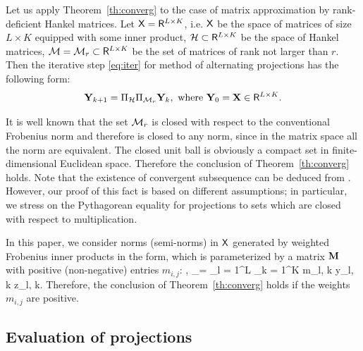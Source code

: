 \documentclass[sii]{ipart}
\begin{document}
\medskip
Let us apply Theorem~\ref{th:converg} to the case of matrix approximation by rank-deficient Hankel matrices. Let $\mathsf{X} = \mathsf{R}^{L\times K}$, i.e. $\mathsf{X}$ be the space of matrices of size $L \times K$ equipped with some inner product, $\mathcal{H} \subset \mathsf{R}^{L\times K}$ be the space of Hankel matrices, $\mathcal{M} = \mathcal{M}_r\subset \mathsf{R}^{L\times K}$ be the set of matrices of rank not larger than $r$. Then the iterative step \ref{eq:iter} for method of alternating projections has the following form:
\begin{equation*}
\bfY_{k+1}=\Pi_\calH \Pi_{\calM_r} \bfY_{k}, \mbox{\ where\ } \bfY_{0}=\bfX \in \spaceR^{L\times K}.
\end{equation*}


It is well known that the set $\mathcal{M}_r$ is closed with respect to the conventional Frobenius norm and therefore is closed
to any norm, since in the matrix space all the norm are equivalent.
The closed unit ball is obviously a compact set in finite-dimensional Euclidean space.
Therefore the conclusion of Theorem~\ref{th:converg} holds.
Note that the existence of convergent subsequence can be deduced from \cite{Cadzow1988}.
However, our proof of this fact is based on different assumptions; in particular, we stress on the Pythagorean equality for projections to sets which are closed with respect to multiplication.

In this paper, we consider norms (semi-norms) in $\mathsf{X}$ generated by weighted Frobenius inner products in the form, which is parameterized by a matrix $\mathbf{M}$ with positive (non-negative) entries $m_{i,j}$:
\be
\label{eq:w_inner_prod}
\langle\bfY, \bfZ\rangle_\bfM = \sum_{l = 1}^L \sum_{k = 1}^K m_{l, k} y_{l, k} z_{l, k}.
\ee
Therefore, the conclusion of Theorem~\ref{th:converg} holds if the weights $m_{i,j}$ are positive.

\subsection{Evaluation of projections}
\end{document}
